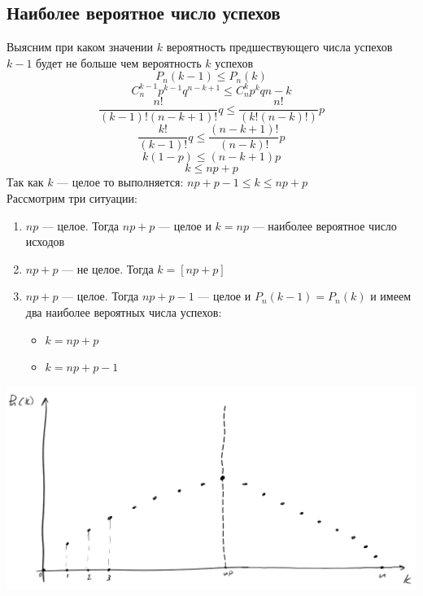 \documentclass[english]{article}
\theoremstyle{plain}
\theoremstyle{remark}
\theoremstyle{definition}
\begin{document}
\subsection{Наиболее вероятное число успехов}
\label{sec:org403c799}
Выясним при каком значении \(k\) вероятность предшествующего числа
успехов \(k - 1\) будет не больше чем вероятность \(k\) успехов
\[ P_n(k - 1) \le P_n(k) \]
\[ C^{k-1}_np^{k - 1}q^{n - k + 1} \le C^k_np^kq{n - k} \]
\[ \frac{n!}{(k - 1)!(n -k + 1)!}q \le \frac{n!}{(k!(n - k)!)}p \]
\[ \frac{k!}{(k-1)!}q \le \frac{(n - k + 1)!}{(n - k)!}p \]
\[ k(1- p) \le (n - k + 1)p \]
\[ k \le np + p \]
Так как \(k\) --- целое то выполняется: \(np + p - 1\le k \le np + p\) \\
Рассмотрим три ситуации:
\begin{enumerate}
\item \(np\) --- целое. Тогда \(np + p\) --- целое и \(k = np\) --- наиболее вероятное число исходов
\item \(np + p\) --- не целое. Тогда \(k = [np + p]\)
\item \(np + p\) --- целое. Тогда \(np + p - 1\) --- целое и \(P_n(k - 1)
   = P_n(k)\) и имеем два наиболее вероятных числа успехов:
\begin{itemize}
\item \(k = np + p\)
\item \(k = np + p - 1\)
\end{itemize}
\end{enumerate}
\begin{center}
\includegraphics[scale=0.35]{4_1.png}
\end{center}
\end{document}
